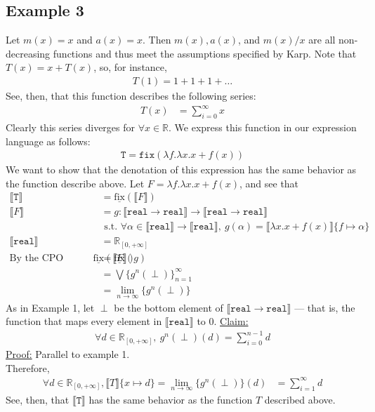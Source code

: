 \documentclass{westhesis}
\theoremstyle{plain}
\theoremstyle{definition}
\newcommand{\R}{\mathbb{R}}
\begin{document}
 \subsection{Example 3} Let $m(x) = x$ and $a(x) = x$. Then $m(x), a(x)$, and $m(x)/x$ are all non-decreasing functions and thus meet the assumptions specified by Karp. Note that $T(x) = x + T(x)$, so, for instance,
\begin{align*}
T(1) = 1 + 1 + 1 + \ldots
\end{align*}
See, then, that this function describes the following series:
\begin{align*}
T(x) &= \sum_{i=0}^{\infty} x 
\end{align*}
Clearly this series diverges for $\forall x \in \R$. We express this function in our expression language as follows:
\begin{align*}
 \texttt{T} = \texttt{fix}(\lambda f. \lambda x.x + f(x))
 \end{align*}
 We want to show that the denotation of this expression has the same behavior as the function describe above. Let $F = \lambda f. \lambda x.x + f (x)$, and see that 
 \begin{align*}
 \llbracket \texttt{T} \rrbracket &= \underline{\text{fix}}(\llbracket F \rrbracket) \\
 \llbracket F \rrbracket &= g : \llbracket \texttt{real} \rightarrow \texttt{real}\rrbracket \rightarrow \llbracket \texttt{real} \rightarrow \texttt{real}\rrbracket \\ &\text{ \ \ \ s.t. } \forall \alpha \in \llbracket \texttt{real}\rrbracket \rightarrow \llbracket \texttt{real}\rrbracket, \ 
 g(\alpha) = \llbracket \lambda x.x + f (x)\rrbracket\{f \mapsto \alpha\} \\
 \llbracket \texttt{real}\rrbracket &= \R_{[0, +\infty]}  
 \\\text{By the CPO fixpoint theorem, } \underline{\text{fix}}(\llbracket F \rrbracket) &= \underline{\text{fix}}(g) \\
&= \bigvee\{g^n (\perp)\}^{\infty}_{n=1} \\
&= \lim_{n \to \infty}\{g^n (\perp)\}
 \end{align*}
As in Example 1, let $\perp$ be the bottom element of $\llbracket \texttt{real} \rightarrow \texttt{real} \rrbracket$ --- that is, 
the function that maps every element in $\llbracket \texttt{real} \rrbracket$ to $0$. 
  \underline{Claim:}
 \begin{align*}
 \forall d \in \R_{[0, +\infty]}, \ g^n(\perp)(d) = \sum_{i = 0}^{n-1}d
 \end{align*}
 \underline{Proof:} Parallel to example 1. \\
Therefore, 
 \begin{align*}
 \forall d \in \R_{[0,+\infty]}, \llbracket T \rrbracket\{x \mapsto d \} =  \lim_{n \to \infty}\{g^n (\perp)\}(d) &= \sum_{i=1}^{\infty} 
 d 
 \end{align*}
 See, then, that $\llbracket \texttt{T} \rrbracket$ has the same behavior as the function $T$ described above.
\end{document}
